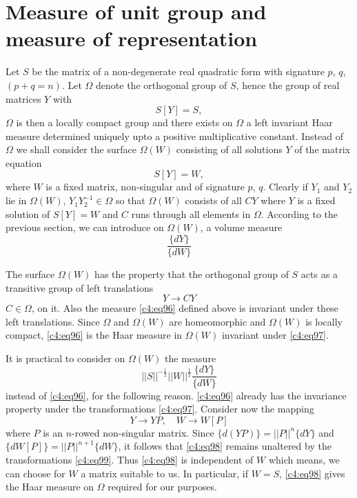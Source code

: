 \section{Measure of unit group and measure of
  representation}\label{chap4:sec6}

Let $S$ be the matrix of a non-degenerate real quadratic form with
signature $p$, $q$, $(p+q=n)$. Let $\Omega$ denote the orthogonal
group of $S$, hence the group of real matrices $Y$ with
$$
S[Y]=S,
$$
$\Omega$ is then a locally compact group and there exists on $\Omega$
a left invariant Haar measure determined uniquely upto a positive
multiplicative constant. Instead of $\Omega$ we shall consider the
surface $\Omega(W)$ consisting of all solutions $Y$ of the matrix
equation 
$$
S[Y]=W,
$$
where $W$ is a fixed matrix, non-singular and of signature $p$,
$q$. Clearly if $Y_{1}$ and $Y_{2}$ lie in $\Omega(W)$,
$Y_{1}Y^{-1}_{2}\in \Omega$ so that $\Omega(W)$ consists of all $CY$
where $Y$ is a fixed solution of $S[Y]=W$ and $C$ runs through all
elements in $\Omega$. According to the previous section,\pageoriginale
we can introduce on $\Omega(W)$, a volume measure
\begin{equation*}
\frac{\{dY\}}{\{dW\}}\tag{96}\label{c4:eq96}
\end{equation*}

The surface $\Omega(W)$ has the property that the orthogonal group of
$S$ acts as a transitive group of left translations
\begin{equation*}
Y\to CY\tag{97}\label{c4:eq97}
\end{equation*}
$C\in \Omega$, on it. Also the measure \eqref{c4:eq96} defined above is
invariant under these left translations. Since $\Omega$ and
$\Omega(W)$ are homeomorphic and $\Omega(W)$ is locally compact,
\eqref{c4:eq96} is the Haar measure in $\Omega(W)$ invariant under
\eqref{c4:eq97}.

It is practical to consider on $\Omega(W)$ the measure
\begin{equation*}
||S||^{-\frac{1}{2}}||W||^{\frac{1}{2}}\frac{\{dY\}}{\{dW\}}\tag{98}\label{c4:eq98}
\end{equation*}
instead of \eqref{c4:eq96}, for the following reason. \eqref{c4:eq96} already
has the invariance property under the transformations
\eqref{c4:eq97}. Consider now the mapping
\begin{equation*}
Y\to YP,\quad W\to W[P]\tag{99}\label{c4:eq99}
\end{equation*}
where $P$ is an $n$-rowed non-singular matrix. Since
$\{d(YP)\}=||P||^{n}\{dY\}$ and $\{dW[P]\}=||P||^{n+1}\{dW\}$, it
follows that \eqref{c4:eq98} remains unaltered by the transformations
\eqref{c4:eq99}. Thus \eqref{c4:eq98} is independent of $W$ which means, we can
choose for $W$ a matrix suitable to us. In particular, if $W=S$,
\eqref{c4:eq98} gives the Haar measure on $\Omega$ required for our
purposes.

